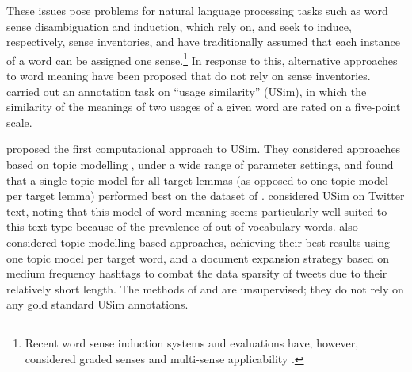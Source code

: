 \documentclass[11pt]{article}
\begin{document}

These issues pose problems for natural language processing tasks such
as word sense disambiguation and induction, which rely on, and seek to
induce, respectively, sense inventories, and have traditionally
assumed that each instance of a word can be assigned one
sense.\footnote{Recent word sense induction systems and evaluations
  have, however, considered graded senses and multi-sense
  applicability \cite{Jurgens:Klapaftis:2013}.} In response
to this, alternative approaches to word meaning have been proposed
that do not rely on sense inventories.  carried out an
annotation task on ``usage similarity'' (USim), in which the
similarity of the meanings of two usages of a given word are rated on
a five-point scale.


 proposed the first computational approach to
USim. They considered approaches based on topic modelling
\cite{Blei2003}, under a wide range of parameter settings, and found
that a single topic model for all target lemmas (as opposed to one
topic model per target lemma) 
performed best on the dataset of . 
considered USim on Twitter text, noting that this model of word
meaning seems particularly well-suited to this text type because of
the prevalence of out-of-vocabulary words. 
also considered topic modelling-based approaches, achieving their best
results using one topic model per target word, and a document
expansion strategy based on medium frequency hashtags to combat the
data sparsity of tweets due to their relatively short length. The
methods of  and 
are unsupervised; they do not rely on any gold standard USim
annotations.
\end{document}
